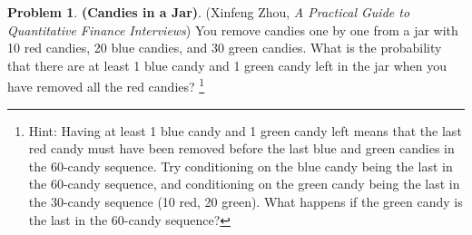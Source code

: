 \documentclass[10pt]{article}
\theoremstyle{definition}
\newtheorem{prob}[theo]{\color{Maroon} Problem}
\theoremstyle{remark}
\begin{document}
\newpage
\begin{prob} \textbf{(Candies in a Jar)}. (Xinfeng Zhou, \emph{A Practical Guide to Quantitative Finance Interviews}) You remove candies one by one from a jar with 10 red candies, 20 blue candies, and 30 green candies. What is the probability that there are at least 1 blue candy and 1 green candy left in the jar when you have removed all the red candies? \footnote{Hint: Having at least 1 blue candy and 1 green candy left means that the last red candy must have been removed before the last blue and green candies in the 60-candy sequence. Try conditioning on the blue candy being the last in the 60-candy sequence, and conditioning on the green candy being the last in the 30-candy sequence (10 red, 20 green). What happens if the green candy is the last in the 60-candy sequence?}

\end{prob} 


\end{document}
